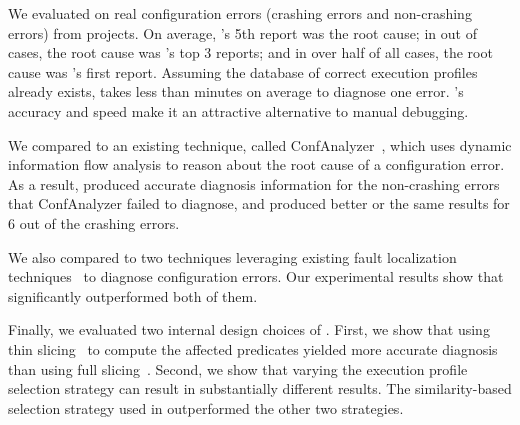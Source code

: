 We evaluated \ourtool on \errors real configuration errors
(\crash crashing errors and \noncrash non-crashing errors)
from \subjectnum projects.
On average, \ourtool's 5th report was the root cause; in
\topnum out of \errors cases, the root cause was \ourtool's
top 3 reports; and in over half of all
cases, the root cause was \ourtool's first report.
Assuming the database of correct execution profiles already exists,
\ourtool takes less than \avgtime minutes on average to diagnose
one error.  \ourtool's accuracy and speed make it an attractive alternative
to manual debugging.


We compared \ourtool to an existing technique, called ConfAnalyzer~\cite{Rabkin:2011:PPC},
which uses dynamic information flow analysis to reason about the root cause of a
configuration error. As a result, \ourtool produced accurate diagnosis information for the \noncrash
non-crashing errors that ConfAnalyzer failed to diagnose,
and produced better or the same results
for 6 out of the \crash crashing errors. 

We also compared \ourtool to two techniques leveraging
existing fault localization techniques~\cite{Jones:2002, McCamant:2003}
to diagnose configuration errors. Our experimental results show
that \ourtool significantly outperformed both of them.




Finally, we evaluated two internal design choices of \ourtool.
First, we show that using thin slicing~\cite{Sridharan:2007} to compute the affected
predicates yielded more accurate diagnosis than using full slicing~\cite{Horwitz:1988}.
Second, we %
show that varying the execution
profile selection strategy can result in substantially different
results. %
The similarity-based selection strategy used in \ourtool outperformed
the other two strategies.


